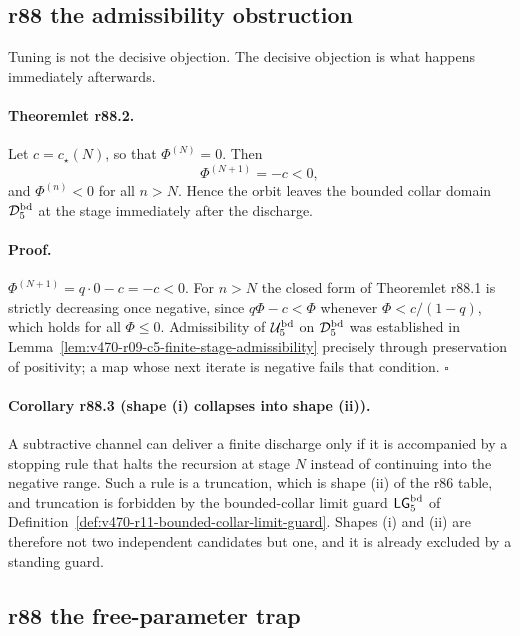 \subsection*{r88 the admissibility obstruction}
\label{subsec:r88-admissibility-obstruction}

Tuning is not the decisive objection.  The decisive objection is what happens immediately
afterwards.

\paragraph{Theoremlet r88.2.}
Let \(c=c_\star(N)\), so that \(\Phi^{(N)}=0\).  Then
\[
\Phi^{(N+1)}=-c<0 ,
\]
and \(\Phi^{(n)}<0\) for all \(n>N\).  Hence the orbit leaves the bounded collar domain
\(\mathcal D_5^{\rm bd}\) at the stage immediately after the discharge.

\paragraph{Proof.}
\(\Phi^{(N+1)}=q\cdot0-c=-c<0\).  For \(n>N\) the closed form of Theoremlet r88.1 is
strictly decreasing once negative, since \(q\Phi-c<\Phi\) whenever \(\Phi<c/(1-q)\), which
holds for all \(\Phi\le0\).  Admissibility of \(\mathcal U_5^{\rm bd}\) on
\(\mathcal D_5^{\rm bd}\) was established in
Lemma~\ref{lem:v470-r09-c5-finite-stage-admissibility} precisely through preservation of
positivity; a map whose next iterate is negative fails that condition. \(\square\)

\paragraph{Corollary r88.3 (shape (i) collapses into shape (ii)).}
A subtractive channel can deliver a finite discharge only if it is accompanied by a stopping
rule that halts the recursion at stage \(N\) instead of continuing into the negative range.
Such a rule is a truncation, which is shape (ii) of the r86 table, and truncation is
forbidden by the bounded-collar limit guard
\(\mathsf{LG}_5^{\rm bd}\) of
Definition~\ref{def:v470-r11-bounded-collar-limit-guard}.  Shapes (i) and (ii) are therefore
not two independent candidates but one, and it is already excluded by a standing guard.

\subsection*{r88 the free-parameter trap}
\label{subsec:r88-free-parameter-trap}

